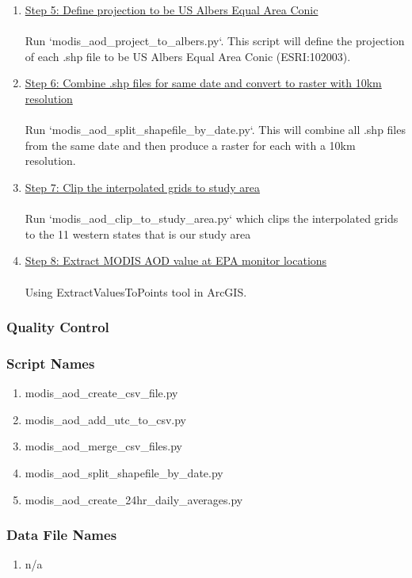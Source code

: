 \begin{enumerate}
\item \underline{Step 5: Define projection to be US Albers Equal Area Conic}\\\\
Run `modis\_aod\_project\_to\_albers.py`. This script will define the projection of each .shp file to be US Albers Equal Area Conic (ESRI:102003).

\item \underline{Step 6: Combine .shp files for same date and convert to raster with 10km resolution}\\\\
Run `modis\_aod\_split\_shapefile\_by\_date.py`. This will combine all .shp files from the same date and then produce a raster for each with a 10km resolution.

\item \underline{Step 7: Clip the interpolated grids to study area}\\\\
Run `modis\_aod\_clip\_to\_study_area.py` which clips the interpolated grids to the 11 western states that is our study area

\item \underline{Step 8: Extract MODIS AOD value at EPA monitor locations}\\\\
Using ExtractValuesToPoints tool in ArcGIS.

\end{enumerate}

\subsubsection*{Quality Control}

\subsubsection*{Script Names}

\begin{enumerate}
\item modis\_aod\_create\_csv\_file.py
\item modis\_aod\_add\_utc\_to\_csv.py
\item modis\_aod\_merge\_csv\_files.py
\item modis\_aod\_split\_shapefile\_by\_date.py
\item modis\_aod\_create\_24hr\_daily\_averages.py
\end{enumerate}

\subsubsection*{Data File Names}

\begin{enumerate}
\item n/a
\end{enumerate}